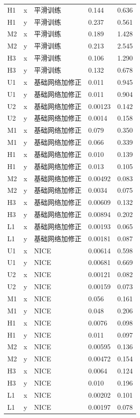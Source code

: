 \documentclass[preprint,12pt,authoryear]{elsarticle}
\begin{document}
{\begin{longtable}[]{@{}lllll@{}}
H1 & x & 平滑训练 & 0.144 & 0.636 \\
H1 & y & 平滑训练 & 0.237 & 0.561 \\
M2 & x & 平滑训练 & 0.189 & 1.428 \\
M2 & y & 平滑训练 & 0.213 & 2.545 \\
H3 & x & 平滑训练 & 0.106 & 1.290 \\
H3 & y & 平滑训练 & 0.132 & 0.678 \\
U1 & x & 基础网络加修正 & 0.011 & 0.945 \\
U1 & y & 基础网络加修正 & 0.011 & 0.904 \\
U2 & x & 基础网络加修正 & 0.00123 & 0.142 \\
U2 & y & 基础网络加修正 & 0.0014 & 0.158 \\
M1 & x & 基础网络加修正 & 0.079 & 0.350 \\
M1 & y & 基础网络加修正 & 0.066 & 0.339 \\
H1 & x & 基础网络加修正 & 0.010 & 0.139 \\
H1 & y & 基础网络加修正 & 0.013 & 0.105 \\
M2 & x & 基础网络加修正 & 0.00492 & 0.083 \\
M2 & y & 基础网络加修正 & 0.0034 & 0.075 \\
H3 & x & 基础网络加修正 & 0.00609 & 0.132 \\
H3 & y & 基础网络加修正 & 0.00894 & 0.202 \\
L1 & x & 基础网络加修正 & 0.00193 & 0.065 \\
L1 & y & 基础网络加修正 & 0.00181 & 0.087 \\
U1 & x & NICE & 0.00614 & 0.598 \\
U1 & y & NICE & 0.00681 & 0.669 \\
U2 & x & NICE & 0.00121 & 0.082 \\
U2 & y & NICE & 0.00159 & 0.073 \\
M1 & x & NICE & 0.056 & 0.161 \\
M1 & y & NICE & 0.048 & 0.206 \\
H1 & x & NICE & 0.0076 & 0.098 \\
H1 & y & NICE & 0.011 & 0.097 \\
M2 & x & NICE & 0.00595 & 0.136 \\
M2 & y & NICE & 0.00472 & 0.154 \\
H3 & x & NICE & 0.0064 & 0.124 \\
H3 & y & NICE & 0.010 & 0.196 \\
L1 & x & NICE & 0.00202 & 0.101 \\
L1 & y & NICE & 0.00197 & 0.078 \\
\end{longtable}}
\end{document}

